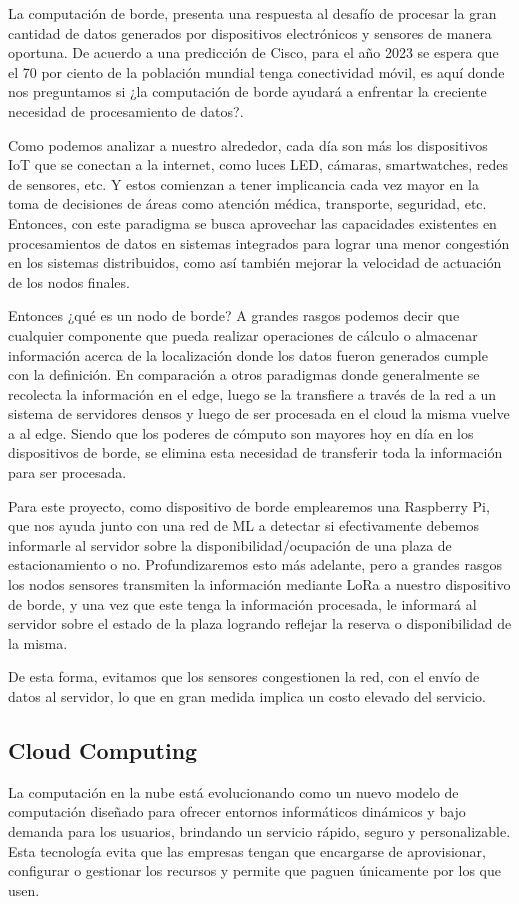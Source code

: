 La computación de borde, presenta una respuesta al desafío de procesar la gran cantidad de datos generados por dispositivos electrónicos y sensores de manera oportuna. De acuerdo a una predicción de Cisco, para el año 2023 se espera que el 70 por ciento de la población mundial tenga conectividad móvil, es aquí donde nos preguntamos si ¿la computación de borde ayudará a enfrentar la creciente necesidad de procesamiento de datos?.

Como podemos analizar a nuestro alrededor, cada día son más los dispositivos IoT que se conectan a la internet, como luces LED, cámaras, smartwatches, redes de sensores, etc. Y estos comienzan a tener implicancia cada vez mayor en la toma de decisiones de áreas como atención médica, transporte, seguridad, etc. Entonces, con este paradigma se busca aprovechar las capacidades existentes en procesamientos de datos en sistemas integrados para lograr una menor congestión en los sistemas distribuidos, como así también mejorar la velocidad de actuación de los nodos finales.

Entonces ¿qué es un nodo de borde? A grandes rasgos podemos decir que cualquier componente que pueda realizar operaciones de cálculo o almacenar información acerca de la localización donde los datos fueron generados cumple con la definición. En comparación a otros paradigmas donde generalmente se recolecta la información en el edge, luego se la transfiere a través de la red a un sistema de servidores densos y luego de ser procesada en el cloud la misma vuelve a al edge. Siendo que los poderes de cómputo son mayores hoy en día en los dispositivos de borde, se elimina esta necesidad de transferir toda la información para ser procesada. 

Para este proyecto, como dispositivo de borde emplearemos una Raspberry Pi, que nos ayuda junto con una red de ML a detectar si efectivamente debemos informarle al servidor sobre la disponibilidad/ocupación de una plaza de estacionamiento o no. Profundizaremos esto más adelante, pero a grandes rasgos los nodos sensores transmiten la información mediante LoRa a nuestro dispositivo de borde, y una vez que este tenga la información procesada, le informará al servidor sobre el estado de la plaza logrando reflejar la reserva o disponibilidad de la misma.

De esta forma, evitamos que los sensores congestionen la red, con el envío de datos al servidor, lo que en gran medida implica un costo elevado del servicio.

\subsection{Cloud Computing}
La computación en la nube está evolucionando como un nuevo modelo de computación diseñado para ofrecer entornos informáticos dinámicos y bajo demanda para los usuarios, brindando un servicio rápido, seguro y personalizable. Esta tecnología evita que las empresas tengan que encargarse de aprovisionar, configurar o gestionar los recursos y permite que paguen únicamente por los que usen.


